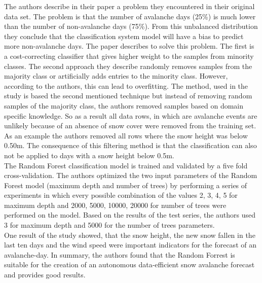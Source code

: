 \documentclass[../masterarbeit.tex]{subfiles}
\begin{document}
The authors describe in their paper a problem they encountered in their original data set. The problem is that the number of avalanche days (25\%) is much lower than the number of non-avalanche days (75\%). From this unbalanced distribution they conclude that the classification system model will have a bias to predict more non-avalanche days. The paper describes to solve this problem. The first is a cost-correcting classifier that gives higher weight to the samples from minority classes. The second approach they describe randomly removes samples from the majority class or artificially adds entries to the minority class. However, according to the authors, this can lead to overfitting. The method, used in the study is based the second mentioned technique but instead of removing random samples of the majority class, the authors removed samples based on domain specific knowledge. So as a result all data rows, in which are avalanche events are unlikely because of an absence of snow cover were removed from the training set. As an example the authors removed all rows where the snow height was below 0.50m. The consequence of this filtering method is that the classification can also not be applied to days with a snow height below 0.5m. \autocite[]{nhess-2021-106} \\
The Random Forest classification model is trained and validated by a five fold cross-validation. The authors optimized the two input parameters of the Random Forest model (maximum depth and number of trees) by performing a series of experiments in which every possible combination of the values 2, 3, 4, 5 for maximum depth and 2000, 5000, 10000, 20000 for number of trees were performed on the model. Based on the results of the test series, the authors used 3 for maximum depth and 5000 for the number of trees parameters. \autocite[]{nhess-2021-106} \\
One result of the study showed, that the snow height, the new snow fallen in the last ten days and the wind speed were important indicators for the forecast of an avalanche-day. In summary, the authors found that the Random Forrest is suitable for the creation of an autonomous data-efficient snow avalanche forecast and provides good results. \autocite[]{nhess-2021-106} \\
\end{document}
